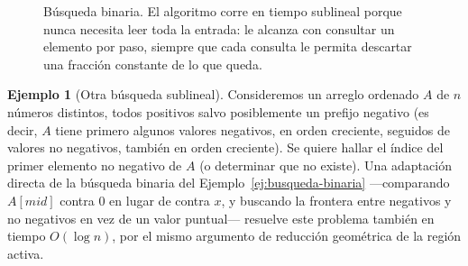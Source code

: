 \documentclass[12pt, spanish, oneside, openany]{book}
\theoremstyle{uprightplain}
\theoremstyle{definition}
\newtheorem{ejemplo}[teorema]{Ejemplo}
\theoremstyle{remark}
\theoremstyle{definition}
\begin{document}
\begin{figure}[H]
\centering
{}
\caption{Búsqueda binaria. El algoritmo corre en tiempo sublineal porque nunca
necesita leer toda la entrada: le alcanza con consultar un elemento por paso,
siempre que cada consulta le permita descartar una fracción constante de lo
que queda.}
\label{fig:busqueda-binaria-fig}
\end{figure}

\begin{ejemplo}[Otra búsqueda sublineal]
\label{ej:sublineal-propio}
Consideremos un arreglo ordenado $A$ de $n$ números distintos, todos positivos salvo posiblemente un prefijo negativo (es decir, $A$ tiene primero algunos valores negativos, en orden creciente, seguidos de valores no negativos, también en orden creciente). Se quiere hallar el índice del primer elemento no negativo de $A$ (o determinar que no existe). Una adaptación directa de la búsqueda binaria del Ejemplo~\ref{ej:busqueda-binaria} —comparando $A[\mathit{mid}]$ contra $0$ en lugar de contra $x$, y buscando la frontera entre negativos y no negativos en vez de un valor puntual— resuelve este problema también en tiempo $O(\log n)$, por el mismo argumento de reducción geométrica de la región activa.
\end{ejemplo}
\end{document}
